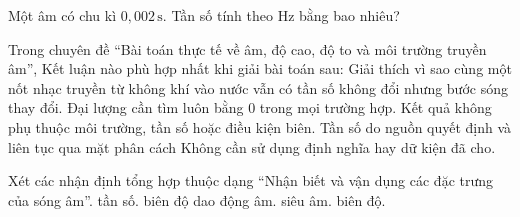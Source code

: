 \begin{ex}
Một âm có chu kì $0,002\,\text{s}$. Tần số tính theo Hz bằng bao nhiêu?
\end{ex}

\begin{ex}
Trong chuyên đề “Bài toán thực tế về âm, độ cao, độ to và môi trường truyền âm”, Kết luận nào phù hợp nhất khi giải bài toán sau: Giải thích vì sao cùng một nốt nhạc truyền từ không khí vào nước vẫn có tần số không đổi nhưng bước sóng thay đổi.
\choice
{Đại lượng cần tìm luôn bằng 0 trong mọi trường hợp.}
{Kết quả không phụ thuộc môi trường, tần số hoặc điều kiện biên.}
{\True Tần số do nguồn quyết định và liên tục qua mặt phân cách}
{Không cần sử dụng định nghĩa hay dữ kiện đã cho.}
\end{ex}

\begin{ex}
Xét các nhận định tổng hợp thuộc dạng “Nhận biết và vận dụng các đặc trưng của sóng âm”.
\choiceTF
{\True tần số.}
{\True biên độ dao động âm.}
{\True siêu âm.}
{biên độ.}
\end{ex}

